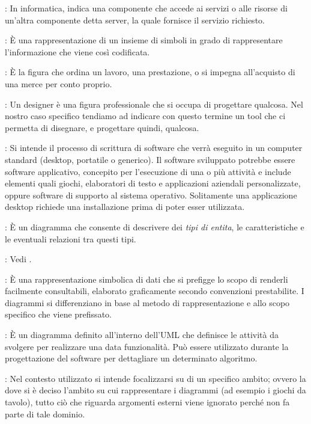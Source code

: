 {	    : In informatica, indica una componente che accede ai servizi o alle risorse di un'altra componente detta server, la quale fornisce il servizio richiesto.

	    : È una rappresentazione di un insieme di simboli in grado di rappresentare l'informazione che viene così codificata.

	    : È la figura che ordina un lavoro, una prestazione, o si impegna all'acquisto di una merce per conto proprio.


		: Un designer è una figura professionale che si occupa di progettare qualcosa. Nel nostro caso specifico tendiamo ad indicare con questo termine un tool che ci permetta
di disegnare, e progettare quindi, qualcosa.

	  : Si intende il processo di scrittura di software che verrà eseguito in un computer standard (desktop, portatile o generico). Il software sviluppato potrebbe essere software applicativo, concepito per l'esecuzione di una o più attività e include elementi quali giochi, elaboratori di testo e applicazioni aziendali personalizzate, oppure software di supporto al sistema operativo. Solitamente una applicazione desktop richiede una installazione prima di poter esser utilizzata.

		: È un diagramma che consente di descrivere dei \emph{tipi di entita}, le caratteristiche e le eventuali relazioni tra questi tipi.

		: Vedi .

		: È una rappresentazione simbolica di dati che si prefigge lo scopo di renderli facilmente consultabili, elaborato graficamente secondo convenzioni prestabilite. I diagrammi si differenziano in base al metodo di rappresentazione e allo scopo specifico che viene prefissato.

		: È un diagramma definito all'interno dell’UML che definisce le attività da svolgere per realizzare una data funzionalità. Può essere utilizzato durante la progettazione del software per dettagliare un determinato algoritmo.

		: Nel contesto utilizzato si intende focalizzarsi su di un specifico ambito; ovvero la dove si è deciso l’ambito su cui rappresentare i diagrammi (ad esempio i giochi da tavolo), tutto ciò che riguarda argomenti esterni viene ignorato perché non fa parte di tale dominio.

}
